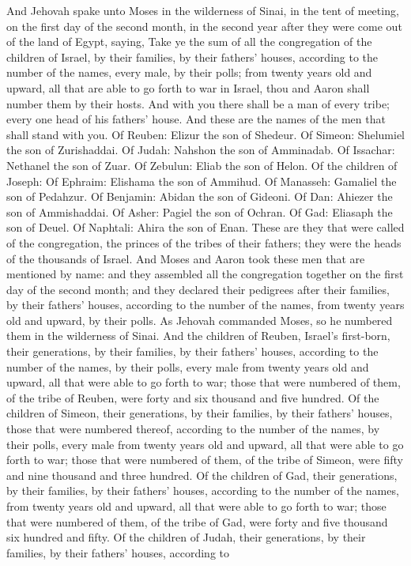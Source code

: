 


And Jehovah spake unto Moses in the wilderness of Sinai, in the tent of meeting, on the first day of the second month, in the second year after they were come out of the land of Egypt, saying, Take ye the sum of all the congregation of the children of Israel, by their families, by their fathers’ houses, according to the number of the names, every male, by their polls; from twenty years old and upward, all that are able to go forth to war in Israel, thou and Aaron shall number them by their hosts. And with you there shall be a man of every tribe; every one head of his fathers’ house. And these are the names of the men that shall stand with you. Of Reuben: Elizur the son of Shedeur. Of Simeon: Shelumiel the son of Zurishaddai. Of Judah: Nahshon the son of Amminadab. Of Issachar: Nethanel the son of Zuar. Of Zebulun: Eliab the son of Helon. Of the children of Joseph: Of Ephraim: Elishama the son of Ammihud. Of Manasseh: Gamaliel the son of Pedahzur. Of Benjamin: Abidan the son of Gideoni. Of Dan: Ahiezer the son of Ammishaddai. Of Asher: Pagiel the son of Ochran. Of Gad: Eliasaph the son of Deuel. Of Naphtali: Ahira the son of Enan. These are they that were called of the congregation, the princes of the tribes of their fathers; they were the heads of the thousands of Israel. And Moses and Aaron took these men that are mentioned by name: and they assembled all the congregation together on the first day of the second month; and they declared their pedigrees after their families, by their fathers’ houses, according to the number of the names, from twenty years old and upward, by their polls. As Jehovah commanded Moses, so he numbered them in the wilderness of Sinai.  And the children of Reuben, Israel’s first-born, their generations, by their families, by their fathers’ houses, according to the number of the names, by their polls, every male from twenty years old and upward, all that were able to go forth to war; those that were numbered of them, of the tribe of Reuben, were forty and six thousand and five hundred.  Of the children of Simeon, their generations, by their families, by their fathers’ houses, those that were numbered thereof, according to the number of the names, by their polls, every male from twenty years old and upward, all that were able to go forth to war; those that were numbered of them, of the tribe of Simeon, were fifty and nine thousand and three hundred.  Of the children of Gad, their generations, by their families, by their fathers’ houses, according to the number of the names, from twenty years old and upward, all that were able to go forth to war; those that were numbered of them, of the tribe of Gad, were forty and five thousand six hundred and fifty.  Of the children of Judah, their generations, by their families, by their fathers’ houses, according to 